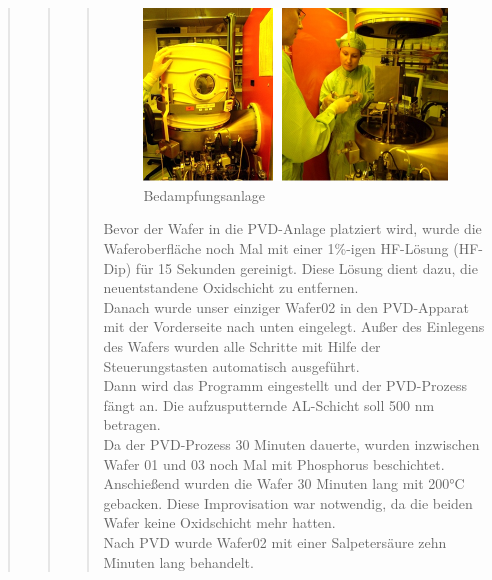 \begin{quote}
\begin{quote}
\begin{quote}
 		\vspace{2em}

    		\begin{figure}[H]
				\hspace{0 cm}
                  \includegraphics[scale=1, trim = 0cm 0cm 0cm 0cm,clip]
                	{./HerstellungBilder/Bedampfungsanlage.png}
                  \caption{Bedampfungsanlage}
                \label{fig:Bedampf}
            \end{figure}
            
    	\vspace{2em}
 		
 		
		Bevor der Wafer in die PVD-Anlage platziert wird, wurde die 
		Waferoberfläche noch Mal mit einer  1\%-igen HF-Lösung (HF-Dip) für 15 
		Sekunden gereinigt. Diese Lösung dient dazu, die neuentstandene 
		Oxidschicht zu entfernen.\\
		Danach wurde unser einziger Wafer02 in den PVD-Apparat mit der 
		Vorderseite nach unten eingelegt. Außer des Einlegens des Wafers wurden 
		alle Schritte mit Hilfe der Steuerungstasten automatisch ausgeführt.\\
		Dann wird das Programm eingestellt und der PVD-Prozess fängt an. Die 
		aufzusputternde AL-Schicht soll 500 nm betragen.\\

		Da der PVD-Prozess 30 Minuten dauerte, wurden inzwischen Wafer 01 und 03 
		noch Mal mit Phosphorus beschichtet. Anschießend wurden die Wafer 30 
		Minuten lang mit 200°C gebacken. Diese Improvisation war notwendig, da 
		die beiden Wafer keine Oxidschicht mehr hatten.\\
		Nach PVD wurde Wafer02 mit einer Salpetersäure zehn Minuten lang 
		behandelt.
		
		\vspace{2em}


\end{quote}
\end{quote}
\end{quote}

